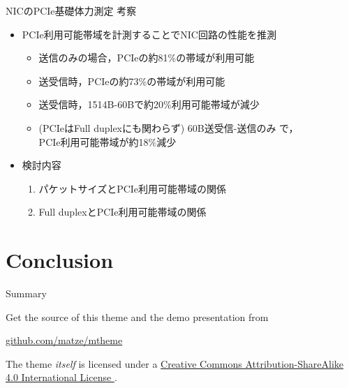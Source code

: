 \documentclass[10pt, compress]{beamer}
\newcommand{\ehref}[2]{\href{#1}{#2 \hspace{-.2em}{\scriptsize\faExternalLink}}}
\begin{document}

\begin{frame}[fragile,t]{NICのPCIe基礎体力測定 考察}
	\vspace{-2em}
	\begin{figure}
		\resizebox{.8\textwidth}{!}{}
	\end{figure}
	\vspace{-1.5em}

	\begin{itemize}
	\item PCIe利用可能帯域を計測することでNIC回路の性能を推測
	\begin{itemize}
		\item 送信のみの場合，PCIeの約81\%の帯域が利用可能
		\item 送受信時，PCIeの約73\%の帯域が利用可能
		\item 送受信時，1514B-60Bで約20\%利用可能帯域が減少
		\item (PCIeはFull duplexにも関わらず) 60B送受信-送信のみ で，\\
		      PCIe利用可能帯域が約18\%減少
	\end{itemize}

	\item 検討内容
	\begin{enumerate}
		\item パケットサイズとPCIe利用可能帯域の関係
		\item Full duplexとPCIe利用可能帯域の関係
	\end{enumerate}
	\end{itemize}
\end{frame}


\section{Conclusion}

\begin{frame}{Summary}

  Get the source of this theme and the demo presentation from

  \begin{center}\url{github.com/matze/mtheme}\end{center}

  The theme \emph{itself} is licensed under a
  \ehref{http://creativecommons.org/licenses/by-sa/4.0/}{Creative Commons
  Attribution-ShareAlike 4.0 International License}.

\end{frame}

\end{document}
